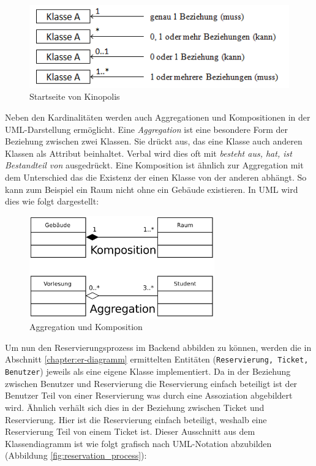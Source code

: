 		\begin{figure}[H]
			\centering 
			\includegraphics[width=12cm]{img/UmlKardinalitaet.png}
			\captionsetup{format=hang}
			\centering\caption[Kardinalitäten nach UML-Notation]{\label{fig:Kardinalitaeten.UML}Startseite von Kinopolis\footnotemark}
		\end{figure}
		
		Neben den Kardinalitäten werden auch Aggregationen und Kompositionen in der UML-Darstellung ermöglicht. Eine \textit{Aggregation} ist eine besondere Form der Beziehung zwischen zwei Klassen. Sie drückt aus, das eine Klasse auch anderen Klassen als Attribut beinhaltet. Verbal wird dies oft mit \textit{besteht aus, hat, ist Bestandteil von} ausgedrückt. Eine Komposition ist ähnlich zur Aggregation mit dem Unterschied das die Existenz der einen Klasse von der anderen abhängt. So kann zum Beispiel ein Raum nicht ohne ein Gebäude existieren. In UML wird dies wie folgt dargestellt:
		
		\begin{figure}[H]
			\centering 
			\includegraphics[width=8cm]{img/aggregation_komposition.JPG}
			\captionsetup{format=hang}
			\caption[Aggregation und Komposition]{\label{fig:aggreagtion_komposition}Aggregation und Komposition}
		\end{figure}
		
		Um nun den Reservierungsprozess im Backend abbilden zu können, werden die in Abschnitt \ref{chapter:er-diagramm} ermittelten Entitäten (\texttt{Reservierung, Ticket, Benutzer}) jeweils als eine eigene Klasse implementiert. Da in der Beziehung zwischen Benutzer und Reservierung die Reservierung einfach beteiligt ist der Benutzer Teil von einer Reservierung was durch eine Assoziation abgebildert wird. Ähnlich verhält sich dies in der Beziehung zwischen Ticket und Reservierung. Hier ist die Reservierung einfach beteiligt, weshalb eine Reservierung Teil von einem Ticket ist. Dieser Ausschnitt aus dem Klassendiagramm ist wie folgt grafisch nach UML-Notation abzubilden (Abbildung \ref{fig:reservation_process}):
		
